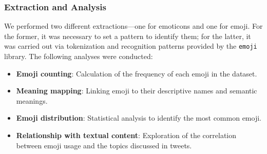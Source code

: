 \subsubsection{Extraction and Analysis}
We performed two different extractions—one for emoticons and one for emoji. For the former, it was necessary to set a pattern to identify them; for the latter, it was carried out via tokenization and recognition patterns provided by the \texttt{emoji} library. The following analyses were conducted:
\begin{itemize}
    \item \textbf{Emoji counting}: Calculation of the frequency of each emoji in the dataset.
    \item \textbf{Meaning mapping}: Linking emoji to their descriptive names and semantic meanings.
    \item \textbf{Emoji distribution}: Statistical analysis to identify the most common emoji.
    \item \textbf{Relationship with textual content}: Exploration of the correlation between emoji usage and the topics discussed in tweets.
\end{itemize}

